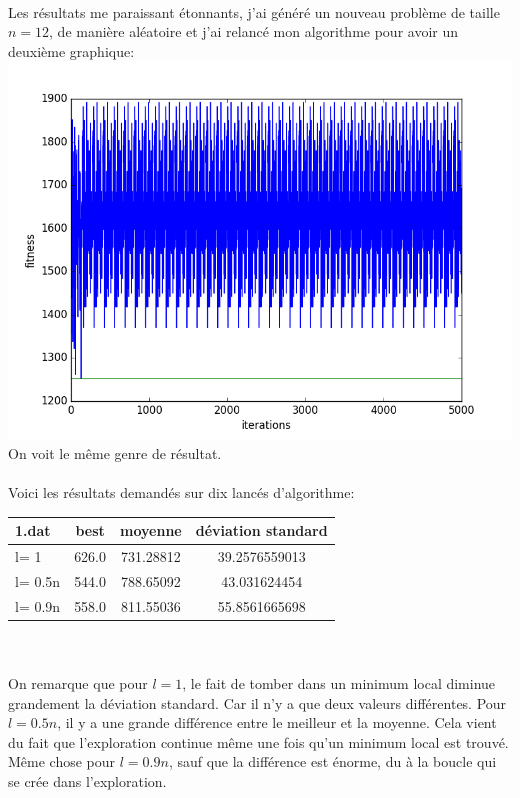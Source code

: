 \documentclass[a4paper, 11pt]{article}
\begin{document}
\paragraph{}
Les résultats me paraissant étonnants, j'ai généré un nouveau problème de taille $n=12$, de manière aléatoire et j'ai relancé mon algorithme
pour avoir un deuxième graphique:
\\
\includegraphics[scale=0.5]{l_0_9_a}
\\
On voit le même genre de résultat.

\paragraph{}
Voici les résultats demandés sur dix lancés d'algorithme:
\\
\begin{tabular}{|l|c|c|c|}
\hline
1.dat & best & moyenne & déviation standard\\
\hline
l= 1 & 626.0 &731.28812	& 39.2576559013 \\
\hline
l= 0.5n& 544.0 & 788.65092 & 43.031624454\\
\hline
l= 0.9n	&558.0	& 811.55036 & 55.8561665698 \\
 \hline
\end{tabular} 
\\
\paragraph{}
On remarque que pour $l=1$, le fait de tomber dans un minimum local diminue grandement la déviation standard. Car il n'y a que deux 
valeurs différentes.
Pour $l=0.5n$, il y a une grande différence entre le meilleur et la moyenne. Cela vient du fait que l'exploration continue même une fois 
qu'un minimum local est trouvé.
Même chose pour $l=0.9n$, sauf que la différence est énorme, du à la boucle qui se crée dans l'exploration.
\end{document}
